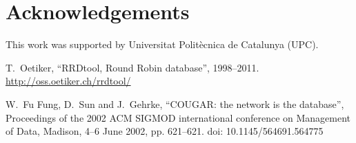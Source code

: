 \documentclass{scrartcl}
\begin{document}
\section*{Acknowledgements}

This work was supported by Universitat Polit\`{e}cnica de Catalunya (UPC).




\begin{thebibliography}{99}





 T.\ Oetiker, ``RRDtool, Round Robin database'',
  1998--2011.  \url{http://oss.oetiker.ch/rrdtool/}


 W.\ Fu Fung, D.\ Sun and J.\ Gehrke, ``COUGAR: the
  network is the database'', Proceedings of the 2002 ACM SIGMOD
  international conference on Management of Data, Madison, 4--6 June
  2002, pp. 621--621. doi: 10.1145/564691.564775



\end{thebibliography}
\end{document}
